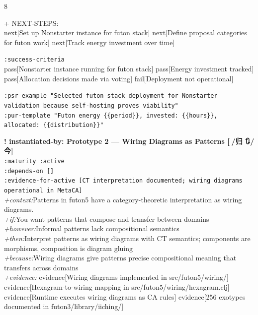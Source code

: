 \documentclass[landscape]{article}
\newcommand{\flexitag}[1]{\textcolor[gray]{0.35}{\textit{#1}}}
\newenvironment{devmapactive}{%
  \def\FrameCommand{\colorbox{devmapactivebg}}%
  \setlength{\fboxsep}{2pt}%
  \MakeFramed{\advance\hsize-\width \FrameRestore}%
}{\endMakeFramed}
\newenvironment{devmapgreenfield}{%
  \def\FrameCommand{\colorbox{devmapgreenfieldbg}}%
  \setlength{\fboxsep}{2pt}%
  \MakeFramed{\advance\hsize-\width \FrameRestore}%
}{\endMakeFramed}
\begin{document}
\begin{paracol}{8}
\begin{devmapgreenfield}
\par
  + NEXT-STEPS:\\
    next[Set up Nonstarter instance for futon stack] next[Define proposal categories for futon work] next[Track energy investment over time]\\
\par
  \texttt{:\allowbreak{}success-\allowbreak{}criteria}\\
    pass[Nonstarter instance running for futon stack] pass[Energy investment tracked] pass[Allocation decisions made via voting] fail[Deployment not operational]\\
\par
  \texttt{:\allowbreak{}psr-\allowbreak{}example "Selected futon-\allowbreak{}stack deployment for Nonstarter validation because self-\allowbreak{}hosting proves viability"}\\
  \texttt{:\allowbreak{}pur-\allowbreak{}template "Futon energy \{\{period\}\},\allowbreak{} invested:\allowbreak{} \{\{hours\}\},\allowbreak{} allocated:\allowbreak{} \{\{distribution\}\}"}\\
\par
\par
\end{devmapgreenfield}
\begin{devmapactive}
\textbf{! instantiated-by: Prototype 2 — Wiring Diagrams as Patterns [🌲/归 🔃/今]}\\
  \texttt{:\allowbreak{}maturity :\allowbreak{}active}\\
  \texttt{:\allowbreak{}depends-\allowbreak{}on []}\\
  \texttt{:\allowbreak{}evidence-\allowbreak{}for-\allowbreak{}active [CT interpretation documented;\allowbreak{} wiring diagrams operational in MetaCA]}\\
  \flexitag{+context:}Patterns in futon5 have a category-theoretic interpretation as wiring diagrams.\\
  \flexitag{+if:}You want patterns that compose and transfer between domains\\
  \flexitag{+however:}Informal patterns lack compositional semantics\\
  \flexitag{+then:}Interpret patterns as wiring diagrams with CT semantics; components are morphisms, composition is diagram gluing\\
  \flexitag{+because:}Wiring diagrams give patterns precise compositional meaning that transfers across domains\\
  \flexitag{+evidence:} evidence[Wiring diagrams implemented in src/futon5/wiring/] evidence[Hexagram-to-wiring mapping in src/futon5/wiring/hexagram.clj] evidence[Runtime executes wiring diagrams as CA rules] evidence[256 exotypes documented in futon3/library/iiching/]\\

\end{devmapactive}
\end{paracol}
\end{document}
